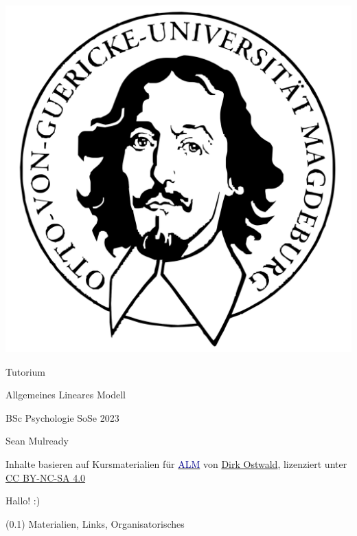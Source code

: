 \documentclass[
  8pt,
  ignorenonframetext,
]{beamer}
\author{}
\date{\vspace{-2.5em}}
\begin{document}
\begin{frame}[plain]{}
\protect\hypertarget{section}{}
\center

\begin{center}\includegraphics[width=0.2\linewidth]{../Abbildungen/wtfi_otto} \end{center}

\vspace{2mm}

\huge

Tutorium

\Large

Allgemeines Lineares Modell \vspace{4mm}

\normalsize

BSc Psychologie SoSe 2023

\vspace{12mm}
\normalsize

Sean Mulready

\vspace{3mm}
\scriptsize

Inhalte basieren auf Kursmaterialien für
\href{https://www.ipsy.ovgu.de/Institut/Abteilungen+des+Institutes/Methodenlehre+I+_+Experimentelle+und+Neurowissenschaftliche+Psychologie/Lehre/Sommersemester+2023/Allgemeines+Lineares+Modell.html}{\textcolor{darkblue}{ALM}}
von
\href{https://www.ipsy.ovgu.de/Institut/Abteilungen+des+Institutes/Methodenlehre+I+_+Experimentelle+und+Neurowissenschaftliche+Psychologie/Team/Dirk+Ostwald.html}{Dirk
Ostwald}, lizenziert unter
\href{https://creativecommons.org/licenses/by-sa/4.0/deed.de}{CC
BY-NC-SA 4.0}
\end{frame}

\begin{frame}[plain]{}
\protect\hypertarget{section-1}{}
\huge
\center
\vfill

Hallo! :) \vfill
\end{frame}

\begin{frame}[plain]{}
\protect\hypertarget{section-2}{}
\huge
\center
\vfill

(0.1) Materialien, Links, Organisatorisches \vfill
\end{frame}
\end{document}
